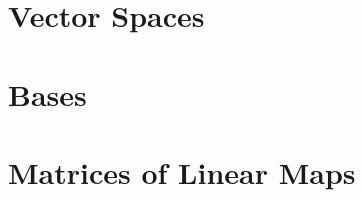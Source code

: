 \documentclass[british,11pt,a4paper]{report}
\begin{document}
\maketitle
\tableofcontents

\chapter{Vector Spaces}

\chapter{Bases}

\chapter{Matrices of Linear Maps}

\end{document}
